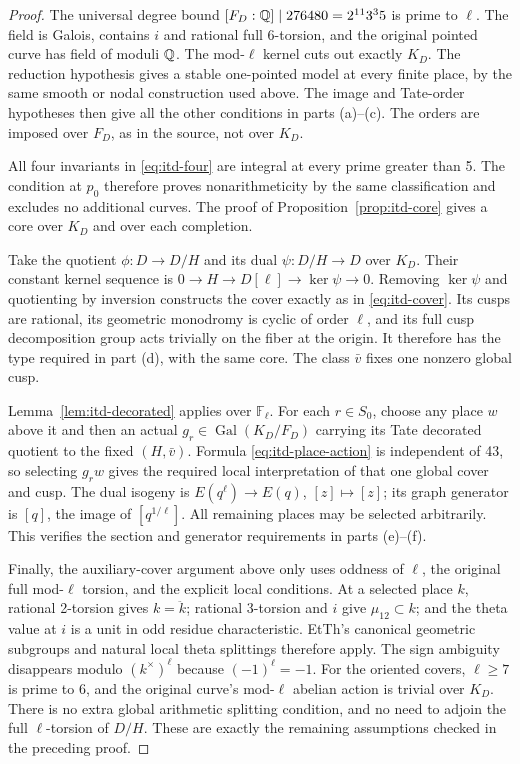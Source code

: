 \begin{proof}
The universal degree bound
$[F_D:\mathbb Q]\mid276480=2^{11}3^3 5$ is prime to $\ell$.
The field is Galois, contains $i$ and rational full 6-torsion,
and the original pointed curve has field of moduli $\mathbb Q$.
The mod-$\ell$ kernel cuts out exactly $K_D$.
The reduction hypothesis gives a stable one-pointed model at
every finite place, by the same smooth or nodal construction
used above. The image and Tate-order hypotheses then give all
the other conditions in parts (a)--(c). The orders are imposed
over $F_D$, as in the source, not over $K_D$.

All four invariants in \eqref{eq:itd-four} are integral at every
prime greater than 5. The condition at $p_0$ therefore proves
nonarithmeticity by the same classification and excludes no
additional curves. The proof of Proposition~\ref{prop:itd-core}
gives a core over $K_D$ and over each completion.

Take the quotient $\phi:D\to D/H$ and its dual
$\psi:D/H\to D$ over $K_D$. Their constant kernel sequence is
$0\to H\to D[\ell]\to\ker\psi\to0$. Removing $\ker\psi$
and quotienting by inversion constructs the cover exactly as in
\eqref{eq:itd-cover}. Its cusps are rational, its geometric
monodromy is cyclic of order $\ell$, and its full cusp
decomposition group acts trivially on the fiber at the origin.
It therefore has the type required in part (d), with the same core.
The class $\bar v$ fixes one nonzero global cusp.

Lemma~\ref{lem:itd-decorated} applies over $\mathbb F_\ell$.
For each $r\in S_0$, choose any place $w$ above it and then an
actual $g_r\in\operatorname{Gal}(K_D/F_D)$ carrying its Tate
decorated quotient to the fixed $(H,\bar v)$. Formula
\eqref{eq:itd-place-action} is independent of 43, so selecting
$g_rw$ gives the required local interpretation of that one
global cover and cusp. The dual isogeny is
$E(q^\ell)\to E(q)$, $[z]\mapsto[z]$; its graph generator is
$[q]$, the image of $[q^{1/\ell}]$. All remaining places may
be selected arbitrarily. This verifies the section and generator
requirements in parts (e)--(f).

Finally, the auxiliary-cover argument above only uses oddness of
$\ell$, the original full mod-$\ell$ torsion, and the explicit
local conditions. At a selected place $k$, rational 2-torsion
gives $k=\ddot k$; rational 3-torsion and $i$ give
$\mu_{12}\subset k$; and the theta value at $i$ is a unit
in odd residue characteristic. EtTh's canonical geometric
subgroups and natural local theta splittings therefore apply.
The sign ambiguity disappears modulo $(k^\times)^\ell$ because
$(-1)^\ell=-1$. For the oriented covers, $\ell\ge7$ is
prime to 6, and the original curve's mod-$\ell$ abelian action
is trivial over $K_D$. There is no extra global arithmetic
splitting condition, and no need to adjoin the full
$\ell$-torsion of $D/H$. These are exactly the remaining
assumptions checked in the preceding proof.
\end{proof}

